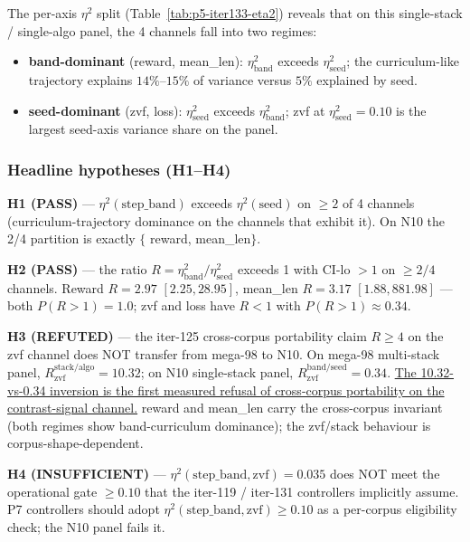The per-axis $\eta^2$ split (Table~\ref{tab:p5-iter133-eta2}) reveals that
on this single-stack / single-algo panel, the 4 channels fall into two
regimes:
\begin{itemize}
\item \textbf{band-dominant} (reward, mean\_len): $\eta^2_{\mathrm{band}}$
  exceeds $\eta^2_{\mathrm{seed}}$; the curriculum-like trajectory explains
  $14\%$--$15\%$ of variance versus $5\%$ explained by seed.
\item \textbf{seed-dominant} (zvf, loss): $\eta^2_{\mathrm{seed}}$ exceeds
  $\eta^2_{\mathrm{band}}$; zvf at $\eta^2_{\mathrm{seed}}=0.10$ is the
  largest seed-axis variance share on the panel.
\end{itemize}

\subsubsection{Headline hypotheses (H1--H4)}
\label{sec:p5-iter133-headlines}
\textbf{H1 (PASS)} --- $\eta^2(\mathrm{step\_band})$ exceeds $\eta^2(\mathrm{seed})$
on $\geq 2$ of 4 channels (curriculum-trajectory dominance on the channels
that exhibit it). On N10 the 2/4 partition is exactly $\{$
reward, mean\_len$\}$.

\textbf{H2 (PASS)} --- the ratio $R = \eta^2_{\mathrm{band}} / \eta^2_{\mathrm{seed}}$
exceeds 1 with CI-lo $>1$ on $\geq 2/4$ channels. Reward $R=2.97$
$[2.25, 28.95]$, mean\_len $R=3.17$ $[1.88, 881.98]$ --- both
$P(R>1)=1.0$; zvf and loss have $R<1$ with $P(R>1)\approx 0.34$.

\textbf{H3 (REFUTED)} --- the iter-125 cross-corpus portability claim
$R \geq 4$ on the zvf channel does NOT transfer from mega-98 to N10.
On mega-98 multi-stack panel, $R_{\mathrm{zvf}}^{\mathrm{stack/algo}}=10.32$;
on N10 single-stack panel, $R_{\mathrm{zvf}}^{\mathrm{band/seed}}=0.34$.
\underline{The 10.32-vs-0.34 inversion is the first measured refusal of
cross-corpus portability on the contrast-signal channel.} reward and
mean\_len carry the cross-corpus invariant (both regimes show band-curriculum
dominance); the zvf/stack behaviour is corpus-shape-dependent.

\textbf{H4 (INSUFFICIENT)} --- $\eta^2(\mathrm{step\_band}, \mathrm{zvf}) = 0.035$
does NOT meet the operational gate $\geq 0.10$ that the iter-119 / iter-131
controllers implicitly assume. P7 controllers should adopt
$\eta^2(\mathrm{step\_band}, \mathrm{zvf}) \geq 0.10$ as a per-corpus
eligibility check; the N10 panel fails it.

